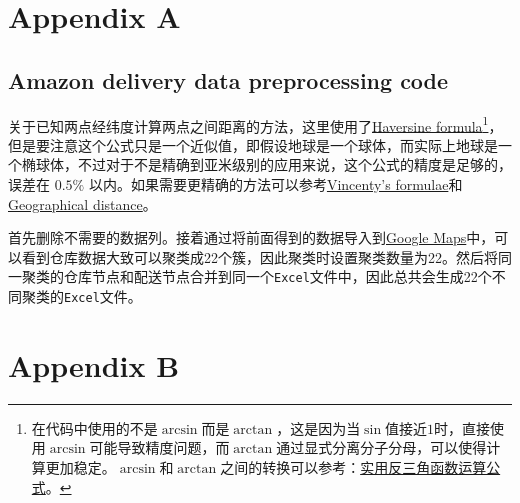 \chapter{Appendix A}

\section{Amazon delivery data preprocessing code}\label{sec:amazon-delivery-data-preprocessing-code}
关于已知两点经纬度计算两点之间距离的方法，这里使用了\href{https://www.wikiwand.com/en/articles/Haversine_formula}{Haversine formula}\footnote{在代码中使用的不是$\arcsin$而是$\arctan$，这是因为当$\sin$值接近$1$时，直接使用$\arcsin$可能导致精度问题，而$\arctan$通过显式分离分子分母，可以使得计算更加稳定。$\arcsin$和$\arctan$之间的转换可以参考：\href{https://zhuanlan.zhihu.com/p/111197233}{实用反三角函数运算公式}。}，但是要注意这个公式只是一个近似值，即假设地球是一个球体，而实际上地球是一个椭球体，不过对于不是精确到亚米级别的应用来说，这个公式的精度是足够的，误差在 $0.5\%$ 以内。如果需要更精确的方法可以参考\href{https://www.wikiwand.com/en/articles/Vincenty%27s_formulae}{Vincenty's formulae}和\href{https://www.wikiwand.com/en/articles/Geographical_distance}{Geographical distance}。



首先删除不需要的数据列。接着通过将前面得到的数据导入到\href{https://www.google.com/maps/d/}{Google Maps}中，可以看到仓库数据大致可以聚类成22个簇，因此聚类时设置聚类数量为22。然后将同一聚类的仓库节点和配送节点合并到同一个\texttt{Excel}文件中，因此总共会生成22个不同聚类的\texttt{Excel}文件。


\chapter{Appendix B}
